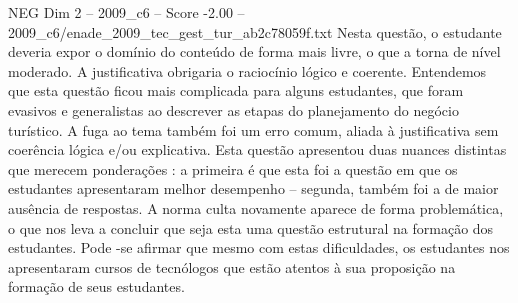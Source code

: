 \begin{textsample}{NEG Dim 2 – 2009\_c6 – Score -2.00 – 2009\_c6/enade\_2009\_tec\_gest\_tur\_ab2c78059f.txt}
Nesta questão, o estudante deveria expor o domínio do conteúdo de forma mais livre, o que a torna de nível moderado.
A justificativa obrigaria o raciocínio lógico e coerente.
Entendemos que esta questão ficou mais complicada para alguns estudantes, que foram evasivos e generalistas ao descrever as etapas do planejamento do negócio turístico.
A fuga ao tema também foi um erro comum, aliada à justificativa sem coerência lógica e/ou explicativa.
Esta questão apresentou duas nuances distintas que merecem ponderações : a primeira é que esta foi a questão em que os estudantes apresentaram melhor desempenho – segunda, também foi a de maior ausência de respostas.
A norma culta novamente aparece de forma problemática, o que nos leva a concluir que seja esta uma questão estrutural na formação dos estudantes.
Pode -se afirmar que mesmo com estas dificuldades, os estudantes nos apresentaram cursos de tecnólogos que estão atentos à sua proposição na formação de seus estudantes.

\end{textsample}
